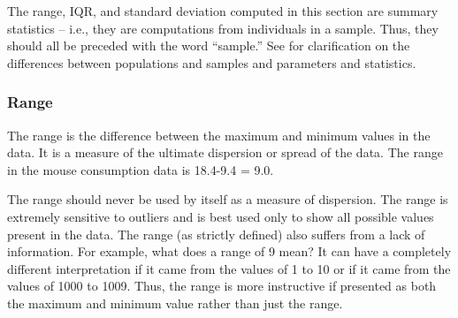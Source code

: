 \documentclass[10pt,openany]{book}\usepackage[]{graphicx}\usepackage[]{color}
\begin{document}
The range, IQR, and standard deviation computed in this section are summary statistics -- i.e., they are computations from individuals in a sample.  Thus, they should all be preceded with the word ``sample.''  See  for clarification on the differences between populations and samples and parameters and statistics.


\vspace{-12pt}

\subsubsection{Range}
The range is the difference between the maximum and minimum values in the data.  It is a measure of the ultimate dispersion or spread of the data.  The range in the mouse consumption data  is 18.4-9.4 = 9.0.

The range should never be used by itself as a measure of dispersion.  The range is extremely sensitive to outliers and is best used only to show all possible values present in the data.  The range (as strictly defined) also suffers from a lack of information.  For example, what does a range of 9 mean?  It can have a completely different interpretation if it came from the values of 1 to 10 or if it came from the values of 1000 to 1009.  Thus, the range is more instructive if presented as both the maximum and minimum value rather than just the range.


\vspace{-12pt}
\end{document}
